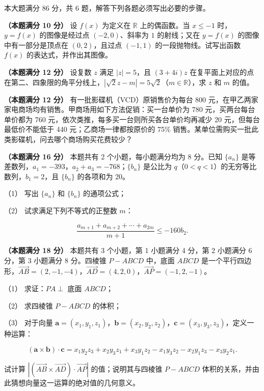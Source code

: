 本大题满分 86 分，共 6 题，解答下列各题必须写出必要的步骤。

\Needspace{0.4\textheight}
\begin{question}
\textbf{（本题满分 10 分）} 设 $f(x)$ 为定义在 $\mathbb{R}$ 上的偶函数。当 $x\le -1$ 时，$y=f(x)$ 的图像是经过点 $(-2,0)$、斜率为 $1$ 的射线；又在 $y=f(x)$ 的图像中有一部分是顶点在 $(0,2)$，且过点 $(-1,1)$ 的一段抛物线。试写出函数 $f(x)$ 的表达式，并作出其图像。
\nopagebreak[4]
\begin{center}\end{center}
\nopagebreak[4]
\end{question}
\begin{question}
\textbf{（本题满分 12 分）} 设复数 $z$ 满足 $|z|=5$，且 $(3+4i)z$ 在复平面上对应的点在第二、四象限的角平分线上，$|\sqrt{2}z-m|=5\sqrt{2}$（$m\in\mathbb{R}$），求 $z$ 和 $m$ 的值。

\end{question}
\begin{question}
\textbf{（本题满分 12 分）} 有一批影碟机（VCD）原销售价为每台 800 元，在甲乙两家家电商场均有销售。甲商场用如下方法促销：买一台单价为 780 元，买两台每台单价都为 760 元，依次类推，每多买一台则所买各台单价均再减少 20 元，但每台最低价不能低于 440 元；乙商场一律都按原价的 75\% 销售。某单位需购买一批此类影碟机，问去哪个商场购买花费较少？

\end{question}
\begin{question}
\textbf{（本题满分 16 分）} 本题共有 2 个小题，每小题满分均为 8 分。已知 $\{a_n\}$ 是等差数列，$a_1=-393$，$a_2+a_3=-768$；$\{b_n\}$ 是公比为 $q$（$0<q<1$）的无穷等比数列，$b_1=2$，且 $\{b_n\}$ 的各项和为 20。

（1） 写出 $\{a_n\}$ 和 $\{b_n\}$ 的通项公式；

（2） 试求满足下列不等式的正整数 $m$：

\nopagebreak[4]
\[
\frac{a_{m+1}+a_{m+2}+\cdots+a_{2m}}{m+1}\le -160b_2.
\]

\end{question}
\begin{question}
\textbf{（本题满分 18 分）} 本题共有 3 个小题，第 1 小题满分 4 分，第 2 小题满分 6 分，第 3 小题满分 8 分。四棱锥 $P-ABCD$ 中，底面 $ABCD$ 是一个平行四边形，$\overrightarrow{AB}=(2,-1,-4)$，$\overrightarrow{AD}=(4,2,0)$，$\overrightarrow{AP}=(-1,2,-1)$。

（1） 求证：$PA\perp$ 底面 $ABCD$；

（2） 求四棱锥 $P-ABCD$ 的体积；

（3） 对于向量 $\mathbf{a}=(x_1,y_1,z_1)$，$\mathbf{b}=(x_2,y_2,z_2)$，$\mathbf{c}=(x_3,y_3,z_3)$，定义一种运算：

\nopagebreak[4]
\[
(\mathbf{a}\times\mathbf{b})\cdot\mathbf{c}=x_1y_2z_3+x_2y_3z_1+x_3y_1z_2-x_1y_3z_2-x_2y_1z_3-x_3y_2z_1.
\]

试计算 $\left|(\overrightarrow{AB}\times\overrightarrow{AD})\cdot\overrightarrow{AP}\right|$ 的值；说明其与四棱锥 $P-ABCD$ 体积的关系，并由此猜想向量这一运算的绝对值的几何意义。

\Needspace{0.4\textheight}
\end{question}
